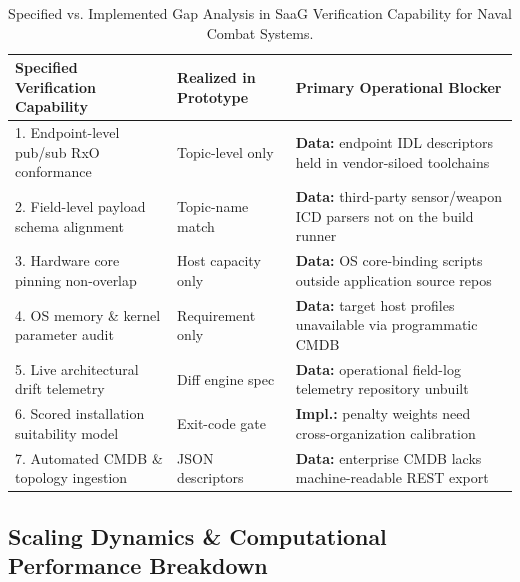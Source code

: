\documentclass[sigconf,9pt]{acmart}
\begin{document}
\begin{table}[t]
\centering
\caption{Specified vs. Implemented Gap Analysis in SaaG Verification Capability for Naval Combat Systems.}
\label{tab:gap_analysis}
\footnotesize
\begin{tabularx}{\textwidth}{l l X}
\toprule
\textbf{Specified Verification Capability} & \textbf{Realized in Prototype} & \textbf{Primary Operational Blocker} \\
\midrule
1. Endpoint-level pub/sub RxO conformance & Topic-level only & \textbf{Data:} endpoint IDL descriptors held in vendor-siloed toolchains \\
2. Field-level payload schema alignment & Topic-name match & \textbf{Data:} third-party sensor/weapon ICD parsers not on the build runner \\
3. Hardware core pinning non-overlap & Host capacity only & \textbf{Data:} OS core-binding scripts outside application source repos \\
4. OS memory \& kernel parameter audit & Requirement only & \textbf{Data:} target host profiles unavailable via programmatic CMDB \\
5. Live architectural drift telemetry & Diff engine spec & \textbf{Data:} operational field-log telemetry repository unbuilt \\
6. Scored installation suitability model & Exit-code gate & \textbf{Impl.:} penalty weights need cross-organization calibration \\
7. Automated CMDB \& topology ingestion & JSON descriptors & \textbf{Data:} enterprise CMDB lacks machine-readable REST export \\
\bottomrule
\end{tabularx}
\end{table}

\subsection{Scaling Dynamics \& Computational Performance Breakdown}
\end{document}
